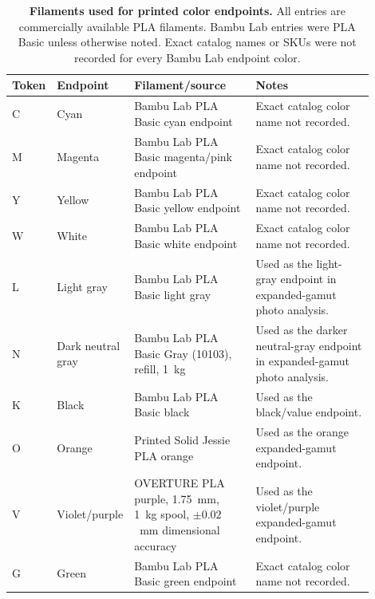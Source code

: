 \documentclass[preprint,12pt,authoryear]{elsarticle}
\begin{document}
\begin{table}[H]
\centering
\caption{\textbf{Filaments used for printed color endpoints.}
All entries are commercially available PLA filaments. Bambu Lab entries were PLA Basic unless otherwise noted. Exact catalog names or SKUs were not recorded for every Bambu Lab endpoint color.}
\scriptsize
\setlength{\tabcolsep}{3pt}
\begin{tabular}{p{0.06\linewidth}p{0.13\linewidth}p{0.35\linewidth}p{0.36\linewidth}}
\toprule
Token & Endpoint & Filament/source & Notes \\
\midrule
C & Cyan & Bambu Lab PLA Basic cyan endpoint & Exact catalog color name not recorded. \\
M & Magenta & Bambu Lab PLA Basic magenta/pink endpoint & Exact catalog color name not recorded. \\
Y & Yellow & Bambu Lab PLA Basic yellow endpoint & Exact catalog color name not recorded. \\
W & White & Bambu Lab PLA Basic white endpoint & Exact catalog color name not recorded. \\
L & Light gray & Bambu Lab PLA Basic light gray & Used as the light-gray endpoint in expanded-gamut photo analysis. \\
N & Dark neutral gray & Bambu Lab PLA Basic Gray (10103), refill, 1~kg & Used as the darker neutral-gray endpoint in expanded-gamut photo analysis. \\
K & Black & Bambu Lab PLA Basic black & Used as the black/value endpoint. \\
O & Orange & Printed Solid Jessie PLA orange & Used as the orange expanded-gamut endpoint. \\
V & Violet/purple & OVERTURE PLA purple, 1.75~mm, 1~kg spool, \(\pm 0.02\)~mm dimensional accuracy & Used as the violet/purple expanded-gamut endpoint. \\
G & Green & Bambu Lab PLA Basic green endpoint & Exact catalog color name not recorded. \\
\bottomrule
\end{tabular}
\label{tab:supp-filaments}
\end{table}
\end{document}
